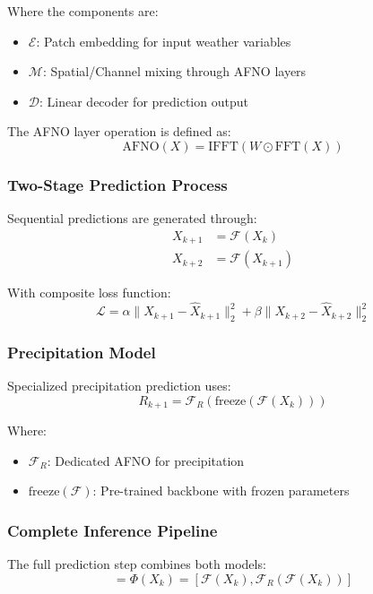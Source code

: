 \documentclass{article}
\begin{document}
Where the components are:
\begin{itemize}
\item $\mathcal{E}$: Patch embedding for input weather variables
\item $\mathcal{M}$: Spatial/Channel mixing through AFNO layers
\item $\mathcal{D}$: Linear decoder for prediction output
\end{itemize}

The AFNO layer operation is defined as:
\begin{equation}
\text{AFNO}(X) = \text{IFFT}(W \odot \text{FFT}(X))
\end{equation}

\subsubsection{Two-Stage Prediction Process}
Sequential predictions are generated through:
\begin{equation}
\begin{aligned}
X_{k+1} &= \mathcal{F}(X_k) \\
X_{k+2} &= \mathcal{F}(X_{k+1})
\end{aligned}
\end{equation}

With composite loss function:
\begin{equation}
\mathcal{L} = \alpha\|X_{k+1} - \hat{X}_{k+1}\|_2^2 + \beta\|X_{k+2} - \hat{X}_{k+2}\|_2^2
\end{equation}

\subsubsection{Precipitation Model}
Specialized precipitation prediction uses:
\begin{equation}
R_{k+1} = \mathcal{F}_R(\text{freeze}(\mathcal{F}(X_k)))
\end{equation}

Where:
\begin{itemize}
\item $\mathcal{F}_R$: Dedicated AFNO for precipitation
\item $\text{freeze}(\mathcal{F})$: Pre-trained backbone with frozen parameters
\end{itemize}

\subsubsection{Complete Inference Pipeline}
The full prediction step combines both models:
\begin{equation}
[X_{k+1}, R_{k+1}] = \Phi(X_k) = [\mathcal{F}(X_k), \mathcal{F}_R(\mathcal{F}(X_k))]
\end{equation}
\end{document}
